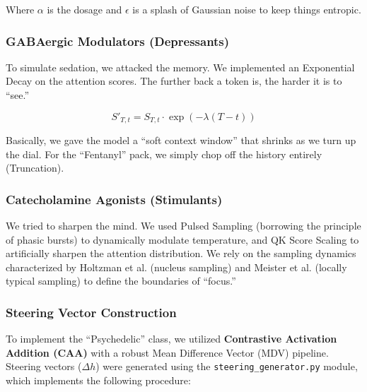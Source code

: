 \documentclass[10pt]{article}
\begin{document}
Where $\alpha$ is the dosage and $\epsilon$ is a splash of Gaussian noise to keep things entropic.

\subsubsection{GABAergic Modulators (Depressants)}
To simulate sedation, we attacked the memory. We implemented an Exponential Decay on the attention scores. The further back a token is, the harder it is to ``see.''

\begin{equation}
    S'_{T,t} = S_{T,t} \cdot \exp(-\lambda (T - t))
\end{equation}

Basically, we gave the model a ``soft context window'' that shrinks as we turn up the dial. For the ``Fentanyl'' pack, we simply chop off the history entirely (Truncation).

\subsubsection{Catecholamine Agonists (Stimulants)}
We tried to sharpen the mind. We used Pulsed Sampling (borrowing the principle of phasic bursts) to dynamically modulate temperature, and QK Score Scaling to artificially sharpen the attention distribution. We rely on the sampling dynamics characterized by Holtzman et al. \cite{holtzman2020} (nucleus sampling) and Meister et al. \cite{meister2023} (locally typical sampling) to define the boundaries of ``focus.''

\subsubsection{Steering Vector Construction}
To implement the ``Psychedelic'' class, we utilized \textbf{Contrastive Activation Addition (CAA)} with a robust Mean Difference Vector (MDV) pipeline. Steering vectors ($\Delta h$) were generated using the \texttt{steering\_generator.py} module, which implements the following procedure:
\end{document}

